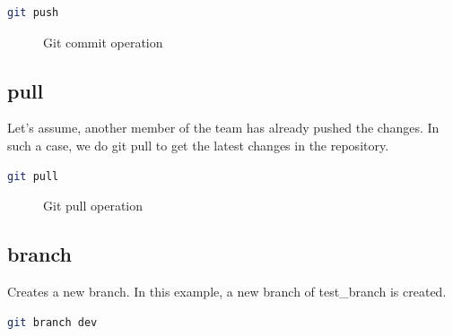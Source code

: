 \documentclass[letterpaper]{article}
\begin{document}
\begin{lstlisting}[language=Bash]
git push
\end{lstlisting}

\begin{figure}[h]
    \centering
    \caption{Git commit operation}
  \end{figure}

\subsection{pull}
Let's assume, another member of the team has already pushed the changes. In such a case, we do git pull to get the latest changes in the repository. 

\begin{lstlisting}[language=Bash]
git pull
\end{lstlisting}

\begin{figure}[h]
    \centering
    \caption{Git pull operation}
  \end{figure}


\subsection{branch}
Creates a new branch. In this example, a new branch of test\_branch is created. 

\begin{lstlisting}[language=Bash]
git branch dev
\end{lstlisting}
\end{document}
